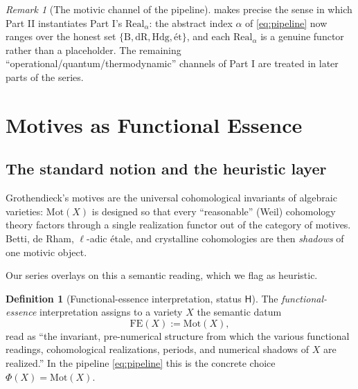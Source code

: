 \documentclass[12pt]{article}
\theoremstyle{definition}
\newtheorem{definition}[theorem]{Definition}
\theoremstyle{remark}
\newtheorem{remark}[theorem]{Remark}
\newcommand{\Mot}{\mathrm{Mot}}
\newcommand{\Real}{\mathrm{Real}}
\newcommand{\Betti}{\mathrm{B}}
\newcommand{\dR}{\mathrm{dR}}
\newcommand{\Hdg}{\mathrm{Hdg}}
\newcommand{\et}{\text{\'et}}
\newcommand{\Hlab}{\ensuremath{\mathsf{H}}}
\begin{document}
\begin{remark}[The motivic channel of the pipeline]
 makes precise the sense in which Part II instantiates Part I's
$\Real_\alpha$: the abstract index $\alpha$ of \eqref{eq:pipeline} now ranges over the honest
set $\{\Betti,\dR,\Hdg,\et\}$, and each $\Real_\alpha$ is a genuine functor rather than a
placeholder. The remaining ``operational/quantum/thermodynamic'' channels of Part I are
treated in later parts of the series.
\end{remark}

\section{Motives as Functional Essence}
\label{sec:motives}

\subsection{The standard notion and the heuristic layer}

Grothendieck's motives are the universal cohomological invariants of algebraic varieties:
$\Mot(X)$ is designed so that every ``reasonable'' (Weil) cohomology theory factors through
a single realization functor out of the category of motives. Betti, de Rham, $\ell$-adic
\'etale, and crystalline cohomologies are then \emph{shadows} of one motivic object.

Our series overlays on this a semantic reading, which we flag as heuristic.

\begin{definition}[Functional-essence interpretation, status \Hlab]
\label{def:FE}
The \emph{functional-essence} interpretation assigns to a variety $X$ the semantic datum
\[
\mathrm{FE}(X) := \Mot(X),
\]
read as ``the invariant, pre-numerical structure from which the various functional readings,
cohomological realizations, periods, and numerical shadows of $X$ are realized.'' In the
pipeline \eqref{eq:pipeline} this is the concrete choice $\Phi(X)=\Mot(X)$.
\end{definition}
\end{document}

